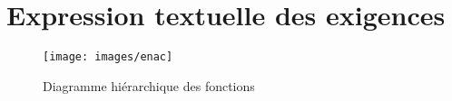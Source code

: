 \section{Expression textuelle des exigences}




\begin{figure}[H]
	\begin{center}	
		\texttt{[image: images/enac]}
		\caption{Diagramme hiérarchique des fonctions}
		\label{hier}
	\end{center}
\end{figure}